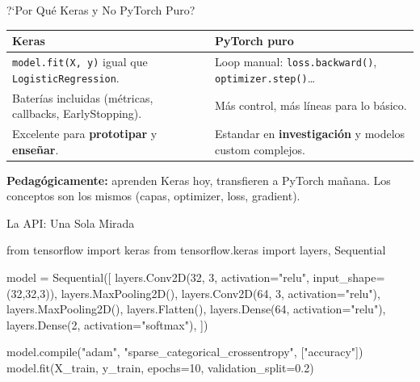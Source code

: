 \documentclass[aspectratio=169, 11pt]{beamer}
\begin{document}
\begin{frame}[shrink]{?`Por Qu\'e Keras y No PyTorch Puro?}
  \vspace{6pt}
  {\footnotesize
  \begin{tabular}{@{}p{6.0cm} p{6.5cm}@{}}
    \toprule
    \textbf{\color{codeBlue}Keras} & \textbf{\color{codePurple}PyTorch puro} \\
    \midrule
    \texttt{model.fit(X, y)} igual que \texttt{LogisticRegression}.
    & Loop manual: \texttt{loss.backward()}, \texttt{optimizer.step()}\ldots \\
    \rowcolor{arcaGray}
    Bater\'ias incluidas (m\'etricas, callbacks, EarlyStopping).
    & M\'as control, m\'as l\'ineas para lo b\'asico. \\
    Excelente para \textbf{prototipar} y \textbf{ense\~nar}.
    & Estandar en \textbf{investigaci\'on} y modelos custom complejos. \\
    \bottomrule
  \end{tabular}
  }

  \vspace{14pt}
  \begin{tcolorbox}[colback=codeGreen!8, colframe=codeGreen, boxrule=0.5pt,
    arc=2pt, left=6pt, right=6pt, top=4pt, bottom=4pt]
    {\scriptsize\color{arcaDark}
    \faKey\hspace{4pt}\textbf{Pedag\'ogicamente:} aprenden Keras hoy,
    transfieren a PyTorch ma\~nana. Los conceptos son los mismos
    (capas, optimizer, loss, gradient).}
  \end{tcolorbox}
\end{frame}

\begin{frame}{La API: Una Sola Mirada}
  \vspace{-4pt}
  \begin{pyblock}
from tensorflow import keras
from tensorflow.keras import layers, Sequential

model = Sequential([
    layers.Conv2D(32, 3, activation="relu", input_shape=(32,32,3)),
    layers.MaxPooling2D(),
    layers.Conv2D(64, 3, activation="relu"),
    layers.MaxPooling2D(),
    layers.Flatten(),
    layers.Dense(64, activation="relu"),
    layers.Dense(2, activation="softmax"),
])

model.compile("adam", "sparse_categorical_crossentropy", ["accuracy"])
model.fit(X_train, y_train, epochs=10, validation_split=0.2)
  \end{pyblock}
\end{frame}
\end{document}
